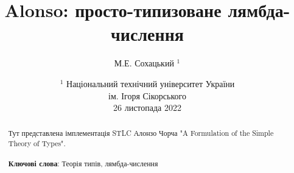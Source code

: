 \documentclass{article}
\begin{document}
\author { М.Е. Сохацький $^1$ }
\title { Alonso: просто-типизоване лямбда-числення }
\date{ \small $^1$ Національний технічний університет України \\
       ім. Ігоря Сікорського \\
       26 листопада 2022 }
\maketitle

\begin{abstract}
Тут представлена імплементація STLC Алонзо Чорча "A Formulation of the Simple Theory of Types".
\\
\\
{\bf Ключові слова}: Теорія типів, лямбда-числення

\end{abstract}
\end{document}
